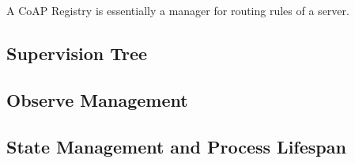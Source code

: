 A CoAP Registry is essentially a manager for routing rules of a server. 



\subsection{Supervision Tree}

\subsection{Observe Management}\label{observe_management}

\subsection{State Management and Process Lifespan}\label{state_management}











